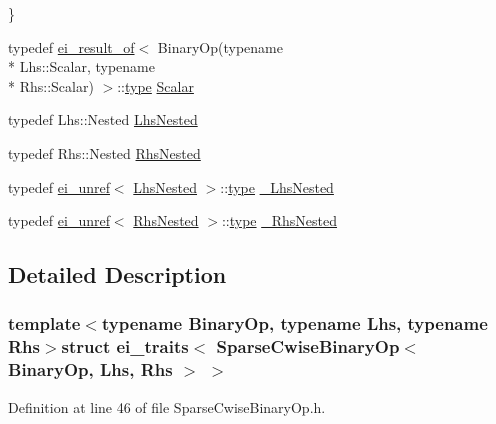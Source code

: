 \begin{DoxyCompactItemize}
 \}
\item 
typedef \hyperlink{structei__result__of}{ei\-\_\-result\-\_\-of}$<$ Binary\-Op(typename \\*
Lhs\-::\-Scalar, typename \\*
Rhs\-::\-Scalar) $>$\-::\hyperlink{glext_8h_a7d05960f4f1c1b11f3177dc963a45d86}{type} \hyperlink{structei__traits_3_01_sparse_cwise_binary_op_3_01_binary_op_00_01_lhs_00_01_rhs_01_4_01_4_a9e78a9198a44524ecaa01235ce19ecc6}{Scalar}
\item 
typedef Lhs\-::\-Nested \hyperlink{structei__traits_3_01_sparse_cwise_binary_op_3_01_binary_op_00_01_lhs_00_01_rhs_01_4_01_4_a70fba1f05cd4ca7e69cfbdf550c18981}{Lhs\-Nested}
\item 
typedef Rhs\-::\-Nested \hyperlink{structei__traits_3_01_sparse_cwise_binary_op_3_01_binary_op_00_01_lhs_00_01_rhs_01_4_01_4_ac6c5573f5517a8f2225ce9be7d46a3f2}{Rhs\-Nested}
\item 
typedef \hyperlink{structei__unref}{ei\-\_\-unref}$<$ \hyperlink{structei__traits_3_01_sparse_cwise_binary_op_3_01_binary_op_00_01_lhs_00_01_rhs_01_4_01_4_a70fba1f05cd4ca7e69cfbdf550c18981}{Lhs\-Nested} $>$\-::\hyperlink{glext_8h_a7d05960f4f1c1b11f3177dc963a45d86}{type} \hyperlink{structei__traits_3_01_sparse_cwise_binary_op_3_01_binary_op_00_01_lhs_00_01_rhs_01_4_01_4_a61105d75febe137987825ec7270c1ef8}{\-\_\-\-Lhs\-Nested}
\item 
typedef \hyperlink{structei__unref}{ei\-\_\-unref}$<$ \hyperlink{structei__traits_3_01_sparse_cwise_binary_op_3_01_binary_op_00_01_lhs_00_01_rhs_01_4_01_4_ac6c5573f5517a8f2225ce9be7d46a3f2}{Rhs\-Nested} $>$\-::\hyperlink{glext_8h_a7d05960f4f1c1b11f3177dc963a45d86}{type} \hyperlink{structei__traits_3_01_sparse_cwise_binary_op_3_01_binary_op_00_01_lhs_00_01_rhs_01_4_01_4_ace44b60e0ccf392bbc089baa54b2eb80}{\-\_\-\-Rhs\-Nested}
\end{DoxyCompactItemize}


\subsection{Detailed Description}
\subsubsection*{template$<$typename Binary\-Op, typename Lhs, typename Rhs$>$struct ei\-\_\-traits$<$ Sparse\-Cwise\-Binary\-Op$<$ Binary\-Op, Lhs, Rhs $>$ $>$}



Definition at line 46 of file Sparse\-Cwise\-Binary\-Op.\-h.



